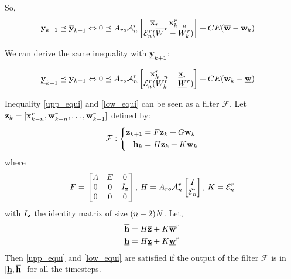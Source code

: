 So,
\begin{equation}\label{upp_equi}
\begin{split}
 \mathbf{y}_{k+1} \preceq \overline{ \mathbf{y}}_{k+1}
& \Leftrightarrow
0 \preceq
A_{ro} \mathcal{A}^r_n
\begin{bmatrix}
\overline{ \mathbf{x}}_r -  \mathbf{x}^r_{k-n} \\
\mathcal{E}^r_n (\overline{W}^r - W^r_k)
\end{bmatrix}
+ C E (\overline{ \mathbf{w}} - \mathbf{w}_{k})
\end{split}
\end{equation}

We can derive the same inequality with $\underline{ \mathbf{y}}_{k+1}$:

\begin{equation}\label{low_equi}
\begin{split}
\underline{ \mathbf{y}}_{k+1} \preceq  \mathbf{y}_{k+1}
& \Leftrightarrow
0 \preceq
A_{ro} \mathcal{A}^r_n
\begin{bmatrix}
 \mathbf{x}^r_{k-n} - \underline{ \mathbf{x}}_r \\
\mathcal{E}^r_n (W^r_k - \underline{W}^r)
\end{bmatrix}
+ C E ( \mathbf{w}_{k} - \underline{ \mathbf{w}})
\end{split}
\end{equation}

\newcommand{\filter}{\mathcal{F}}
Inequality \ref{upp_equi} and \ref{low_equi} can be seen as a filter $\filter$. Let $ \mathbf{z}_k=[ \mathbf{x}^r_{k-n}, \mathbf{w}^r_{k-n},\dots, \mathbf{w}^r_{k-1}]$  defined by:
\begin{equation}
\filter:
\left\{
\begin{split}
\zkn &= F \zk + G \wk \\
\hk &= H \zk + K \wk \\
\end{split}
\right.
\end{equation}
where
\begin{equation}
F = \begin{bmatrix}
A & E & 0\\
0 & 0 & I_{ \mathbf{z}}\\
0 & 0 & 0 \\
\end{bmatrix}
\textrm{, }
H = 
A_{ro} \mathcal{A}^r_n
\begin{bmatrix}
I \\
\mathcal{E}^r_n
\end{bmatrix}
\textrm{, }
K = \mathcal{E}^r_n
\end{equation}
with $I_{ \mathbf{z}}$ the  identity matrix of size $(n-2)N$.
Let,
\begin{align*}
\overline{ \mathbf{h}} &= H \overline{ \mathbf{z}} + K \overline{ \mathbf{w}}^r\\
\underline{ \mathbf{h}} &= H \underline{ \mathbf{z}} + K \underline{ \mathbf{w}}^r
\end{align*}
Then \ref{upp_equi} and \ref{low_equi} are satisfied if the output of the filter $\filter$ is in $[\underline{ \mathbf{h}},\overline{ \mathbf{h}}]$ for all the timesteps.

